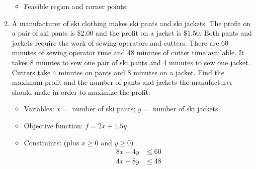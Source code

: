 \begin{enumerate}
\begin{itemize}
\item Feasible region and corner points:
\begin{center}
\end{center}
\end{itemize}\text{} 

\item A manufacturer of ski clothing makes ski pants and ski jackets.  The profit on a pair of ski pants is \$2.00 and the profit on a jacket is \$1.50.  Both pants and jackets require the work of sewing operators and cutters.  There are 60 minutes of sewing operator time and 48 minutes of cutter time available.  It takes 8 minutes to sew one pair of ski pants and 4 minutes to sew one jacket.  Cutters take 4 minutes on pants and 8 minutes on a jacket.  Find the maximum profit and the number of pants and jackets the manufacturer should make in order to maximize the profit.
\begin{itemize}
\item Variables: $x=$ number of ski pants; $y=$ number of ski jackets
\item Objective function: $f = 2x + 1.5y$
\item Constraints: (plus $x \geq 0$ and $y \geq 0$)
\begin{align*}
8x + 4y &\leq 60\\
4x + 8y &\leq 48
\end{align*}


\end{itemize}
\end{enumerate}
